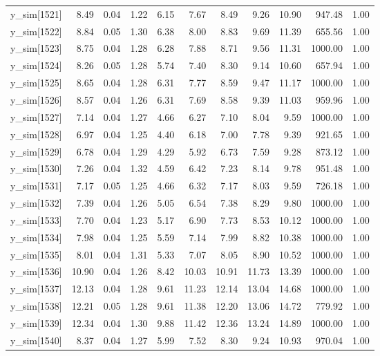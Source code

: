 \begin{table}[ht]
\begin{tabular}{rrrrrrrrrrr}
  y\_sim[1521] & 8.49 & 0.04 & 1.22 & 6.15 & 7.67 & 8.49 & 9.26 & 10.90 & 947.48 & 1.00 \\ 
  y\_sim[1522] & 8.84 & 0.05 & 1.30 & 6.38 & 8.00 & 8.83 & 9.69 & 11.39 & 655.56 & 1.00 \\ 
  y\_sim[1523] & 8.75 & 0.04 & 1.28 & 6.28 & 7.88 & 8.71 & 9.56 & 11.31 & 1000.00 & 1.00 \\ 
  y\_sim[1524] & 8.26 & 0.05 & 1.28 & 5.74 & 7.40 & 8.30 & 9.14 & 10.60 & 657.94 & 1.00 \\ 
  y\_sim[1525] & 8.65 & 0.04 & 1.28 & 6.31 & 7.77 & 8.59 & 9.47 & 11.17 & 1000.00 & 1.00 \\ 
  y\_sim[1526] & 8.57 & 0.04 & 1.26 & 6.31 & 7.69 & 8.58 & 9.39 & 11.03 & 959.96 & 1.00 \\ 
  y\_sim[1527] & 7.14 & 0.04 & 1.27 & 4.66 & 6.27 & 7.10 & 8.04 & 9.59 & 1000.00 & 1.00 \\ 
  y\_sim[1528] & 6.97 & 0.04 & 1.25 & 4.40 & 6.18 & 7.00 & 7.78 & 9.39 & 921.65 & 1.00 \\ 
  y\_sim[1529] & 6.78 & 0.04 & 1.29 & 4.29 & 5.92 & 6.73 & 7.59 & 9.28 & 873.12 & 1.00 \\ 
  y\_sim[1530] & 7.26 & 0.04 & 1.32 & 4.59 & 6.42 & 7.23 & 8.14 & 9.78 & 951.48 & 1.00 \\ 
  y\_sim[1531] & 7.17 & 0.05 & 1.25 & 4.66 & 6.32 & 7.17 & 8.03 & 9.59 & 726.18 & 1.00 \\ 
  y\_sim[1532] & 7.39 & 0.04 & 1.26 & 5.05 & 6.54 & 7.38 & 8.29 & 9.80 & 1000.00 & 1.00 \\ 
  y\_sim[1533] & 7.70 & 0.04 & 1.23 & 5.17 & 6.90 & 7.73 & 8.53 & 10.12 & 1000.00 & 1.00 \\ 
  y\_sim[1534] & 7.98 & 0.04 & 1.25 & 5.59 & 7.14 & 7.99 & 8.82 & 10.38 & 1000.00 & 1.00 \\ 
  y\_sim[1535] & 8.01 & 0.04 & 1.31 & 5.33 & 7.07 & 8.05 & 8.90 & 10.52 & 1000.00 & 1.00 \\ 
  y\_sim[1536] & 10.90 & 0.04 & 1.26 & 8.42 & 10.03 & 10.91 & 11.73 & 13.39 & 1000.00 & 1.00 \\ 
  y\_sim[1537] & 12.13 & 0.04 & 1.28 & 9.61 & 11.23 & 12.14 & 13.04 & 14.68 & 1000.00 & 1.00 \\ 
  y\_sim[1538] & 12.21 & 0.05 & 1.28 & 9.61 & 11.38 & 12.20 & 13.06 & 14.72 & 779.92 & 1.00 \\ 
  y\_sim[1539] & 12.34 & 0.04 & 1.30 & 9.88 & 11.42 & 12.36 & 13.24 & 14.89 & 1000.00 & 1.00 \\ 
  y\_sim[1540] & 8.37 & 0.04 & 1.27 & 5.99 & 7.52 & 8.30 & 9.24 & 10.93 & 970.04 & 1.00 \\ 

\end{tabular}
\end{table}
